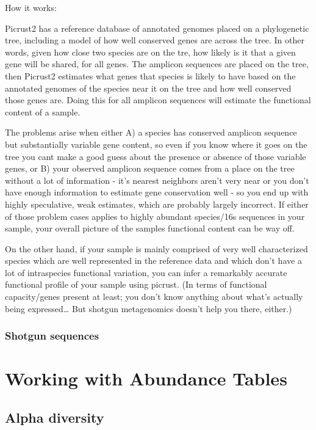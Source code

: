 \documentclass[
]{book}
\begin{document}
How it works:

Picrust2 has a reference database of annotated genomes placed on a phylogenetic tree, including a model of how well conserved genes are across the tree. In other words, given how close two species are on the tre, how likely is it that a given gene will be shared, for all genes. The amplicon sequences are placed on the tree, then Picrust2 estimates what genes that species is likely to have based on the annotated genomes of the species near it on the tree and how well conserved those genes are. Doing this for all amplicon sequences will estimate the functional content of a sample.

The problems arise when either A) a species has conserved amplicon sequence but substantially variable gene content, so even if you know where it goes on the tree you cant make a good guess about the presence or absence of those variable genes, or B) your observed amplicon sequence comes from a place on the tree without a lot of information - it's nearest neighbors aren't very near or you don't have enough information to estimate gene conservation well - so you end up with highly speculative, weak estimates, which are probably largely incorrect. If either of those problem cases applies to highly abundant species/16s sequences in your sample, your overall picture of the samples functional content can be way off.

On the other hand, if your sample is mainly comprised of very well characterized species which are well represented in the reference data and which don't have a lot of intraspecies functional variation, you can infer a remarkably accurate functional profile of your sample using picrust. (In terms of functional capacity/genes present at least; you don't know anything about what's actually being expressed\ldots{} But shotgun metagenomics doesn't help you there, either.)

\hypertarget{shotgun-sequences}{%
\section{Shotgun sequences}\label{shotgun-sequences}}

\hypertarget{part-working-with-abundance-tables}{%
\part{Working with Abundance Tables}\label{part-working-with-abundance-tables}}

\hypertarget{alpha-diversity}{%
\chapter{Alpha diversity}\label{alpha-diversity}}
\end{document}
